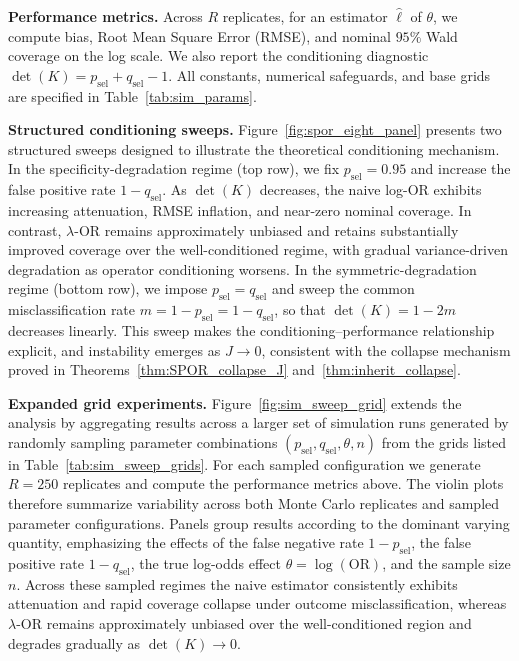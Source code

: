 \documentclass[pdflatex,sn-mathphys-num]{sn-jnl}%
\newcommand{\SPOR}{\textrm{$\lambda$-OR}}
\theoremstyle{thmstyleone}%
\theoremstyle{thmstyletwo}%
\theoremstyle{thmstylethree}%
\begin{document}
\textbf{Performance metrics.}
Across \(R\) replicates, for an estimator \(\widehat\ell\) of \(\theta\),
we compute bias, Root Mean Square Error (RMSE), and nominal \(95\%\) Wald coverage on the log scale.
We also report the conditioning diagnostic
\(\det(K)=p_{\mathrm{sel}}+q_{\mathrm{sel}}-1\).
All constants, numerical safeguards, and base grids are specified in
Table~\ref{tab:sim_params}.

\textbf{Structured conditioning sweeps.}
Figure~\ref{fig:spor_eight_panel} presents two structured sweeps designed to
illustrate the theoretical conditioning mechanism.
In the specificity-degradation regime (top row),
we fix \(p_{\mathrm{sel}}=0.95\) and increase the false positive rate
\(1-q_{\mathrm{sel}}\).
As \(\det(K)\) decreases, the naive log-OR exhibits increasing attenuation,
RMSE inflation, and near-zero nominal coverage.
In contrast, \(\SPOR\) remains approximately unbiased and retains
substantially improved coverage over the well-conditioned regime,
with gradual variance-driven degradation as operator conditioning worsens.
In the symmetric-degradation regime (bottom row),
we impose \(p_{\mathrm{sel}}=q_{\mathrm{sel}}\) and sweep the common
misclassification rate
\(m=1-p_{\mathrm{sel}}=1-q_{\mathrm{sel}}\),
so that
\(\det(K)=1-2m\) decreases linearly.
This sweep makes the conditioning–performance relationship explicit,
and instability emerges as \(J\to0\),
consistent with the collapse mechanism proved in
Theorems~\ref{thm:SPOR_collapse_J} and~\ref{thm:inherit_collapse}.

\textbf{Expanded grid experiments.}
Figure~\ref{fig:sim_sweep_grid} extends the analysis by aggregating results
across a larger set of simulation runs generated by randomly sampling
parameter combinations
\((p_{\mathrm{sel}},q_{\mathrm{sel}},\theta,n)\)
from the grids listed in Table~\ref{tab:sim_sweep_grids}.
For each sampled configuration we generate \(R=250\) replicates and compute
the performance metrics above.
The violin plots therefore summarize variability across both Monte Carlo
replicates and sampled parameter configurations.
Panels group results according to the dominant varying quantity,
emphasizing the effects of the false negative rate \(1-p_{\mathrm{sel}}\),
the false positive rate \(1-q_{\mathrm{sel}}\),
the true log-odds effect \(\theta=\log(\mathrm{OR})\),
and the sample size \(n\).
Across these sampled regimes the naive estimator consistently exhibits
attenuation and rapid coverage collapse under outcome misclassification,
whereas \(\SPOR\) remains approximately unbiased over the well-conditioned
region and degrades gradually as \(\det(K)\to0\).
\end{document}
